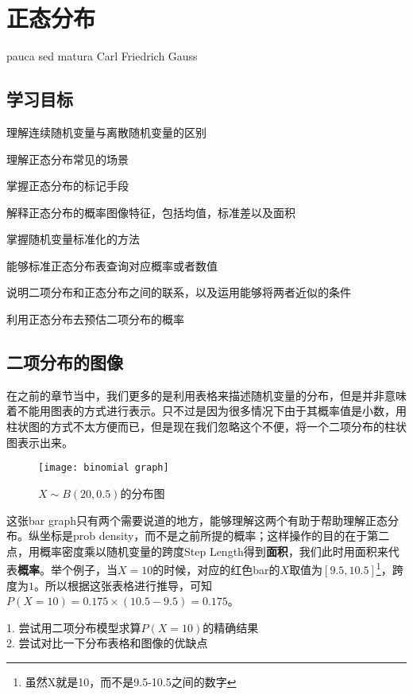 \chapter{正态分布}
pauca sed matura
\makebox{}\hfill Carl Friedrich Gauss

\section*{学习目标}
\begin{todolist}
	\item 理解连续随机变量与离散随机变量的区别
	\item 理解正态分布常见的场景
	\item 掌握正态分布的标记手段
	\item 解释正态分布的概率图像特征，包括均值，标准差以及面积
	\item 掌握随机变量标准化的方法
	\item 能够标准正态分布表查询对应概率或者数值
	\item 说明二项分布和正态分布之间的联系，以及运用能够将两者近似的条件
	\item 利用正态分布去预估二项分布的概率
\end{todolist}
\clearpage

\section{二项分布的图像}
\label{sec:graph of binomial}
在之前的章节当中，我们更多的是利用表格来描述随机变量的分布，但是并非意味着不能用图表的方式进行表示。只不过是因为很多情况下由于其概率值是小数，用柱状图的方式不太方便而已，但是现在我们忽略这个不便，将一个二项分布的柱状图表示出来。
\begin{figure}[H]
\centering
\texttt{[image: binomial graph]}
\label{fig:binomial graph}
\caption{$X\sim B(20,0.5)$的分布图}
\end{figure}
这张bar graph只有两个需要说道的地方，能够理解这两个有助于帮助理解正态分布。纵坐标是\gls{prob density}，而不是之前所提的概率；这样操作的目的在于第二点，用概率密度乘以随机变量的跨度Step Length得到\textbf{面积}，我们此时用面积来代表\textbf{概率}。举个例子，当$X=10$的时候，对应的红色bar的$X$取值为$[9.5,10.5]$\footnote{虽然X就是10，而不是9.5-10.5之间的数字}，跨度为$1$。所以根据这张表格进行推导，可知$P(X=10)=0.175\times(10.5-9.5)=0.175$。

\begin{TaskBox}
1. 尝试用二项分布模型求算$P(X=10)$的精确结果\\
2. 尝试对比一下分布表格和图像的优缺点
\end{TaskBox}

